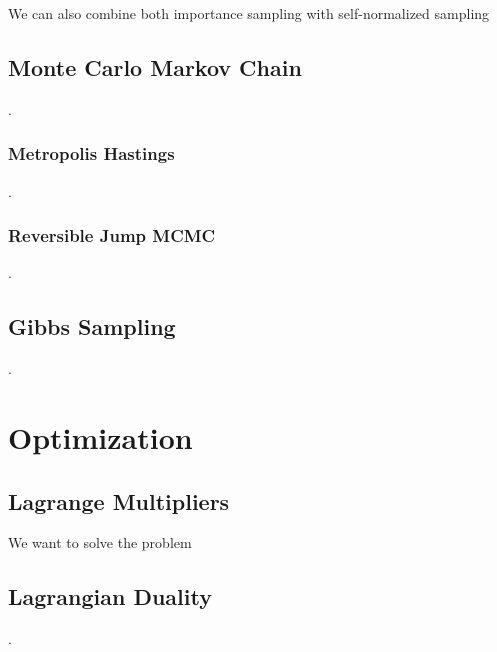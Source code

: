 \documentclass[12pt]{article}
\begin{document}
We can also combine both importance sampling with self-normalized sampling

\iffalse
\todo{check this section}

\eq{
  E_{x \sim p(x)}[f(x)] &= \int p(x) f(x) dx \\
  &= \int q(x) \frac{f(x)p(x)}{q(x)} dx \\  
  &= \int q(x) \frac{f(x) Z_p^{-1} \tilde p(x)}{Z_q^{-1} \tilde q(x)} dx \\
  &= \frac{Z_q}{Z_p} \int q(x) \frac{f(x) \tilde p(x)}{\tilde q(x)} dx \\
  &= \frac{Z_q}{Z_p} E_q \sparen{\frac{f(x) \tilde p(x)}{\tilde q(x)}} \\
  &= E_q \sparen{\frac{\tilde q(x)}{\tilde p(x)}} E_q \sparen{\frac{f(x) \tilde p(x)}{\tilde q(x)}} \\
}

Notice that this only requires the ability to compute the ratio of $p$ and $q$ up to some constant factor.
\fi

\subsection{Monte Carlo Markov Chain}
.
\subsubsection{Metropolis Hastings}
.
\subsubsection{Reversible Jump MCMC}
.
\subsection{Gibbs Sampling}
.
\section{Optimization}

\subsection{Lagrange Multipliers}

We want to solve the problem


\subsection{Lagrangian Duality}
.
\end{document}
